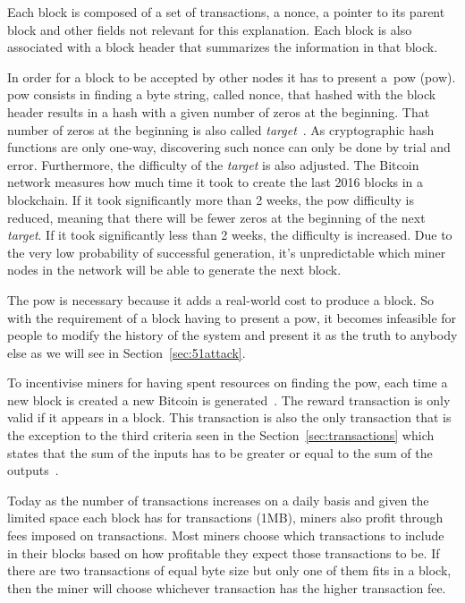Each block is composed of a set of transactions, a nonce, a pointer to its parent block and other fields not relevant for this explanation. Each block is also associated with a block header that summarizes the information in that block.  

In order for a block to be accepted by other nodes it has to present a~\acrlong{pow} (\acrshort{pow}). \acrshort{pow} consists in finding a byte string, called nonce, that hashed with the block header results in a hash with a given number of zeros at the beginning. That number of zeros at the beginning is also called \textit{target}~\cite{decker2013information}. As cryptographic hash functions are only one-way, discovering such nonce can only be done by trial and error. Furthermore, the difficulty of the \textit{target} is also adjusted. The Bitcoin network measures how much time it took to create the last 2016 blocks in a blockchain. If it took significantly more than 2 weeks, the \acrshort{pow} difficulty is reduced, meaning that there will be fewer zeros at the beginning of the next \textit{target}. If it took significantly less than 2 weeks, the difficulty is increased. Due to the very low probability of successful generation, it's unpredictable which miner nodes in the network will be able to generate the next block.

The \acrshort{pow} is necessary because it adds a real-world cost to produce a block. So with the requirement of a block having to present a \acrshort{pow}, it becomes infeasible for people to modify the history of the system and present it as the truth to anybody else as we will see in Section~\ref{sec:51attack}. 

To incentivise miners for having spent resources on finding the \acrshort{pow}, each time a new block is created a new Bitcoin is generated~\cite{decker2013information}. The reward transaction is only valid if it appears in a block. This transaction is also the only transaction that is the exception to the third criteria seen in the Section~\ref{sec:transactions} which states that the sum of the inputs has to be greater or equal to the sum of the outputs~\cite{decker2013information}.

Today as the number of transactions increases on a daily basis and given the limited space each block has for transactions (1MB), miners also profit through fees imposed on transactions. Most miners choose which transactions to include in their blocks based on how profitable they expect those transactions to be. If there are two transactions of equal byte size but only one of them fits in a block, then the miner will choose whichever transaction has the higher transaction fee.

